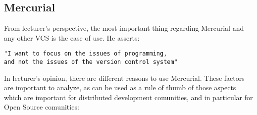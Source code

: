 \documentclass[11pt]{article}
\begin{document}
\subsection{Mercurial}
From lecturer's perspective, the most important thing regarding Mercurial and any other VCS is the ease of use. He asserts:

\begin{verbatim}
"I want to focus on the issues of programming, 
and not the issues of the version control system"
\end{verbatim}

In lecturer's opinion, there are different reasons to use Mercurial. These factors are important to analyze, as can be used as a rule of thumb of those aspects which are important for distributed development comunities, and in particular for Open Source comunities:
\end{document}

